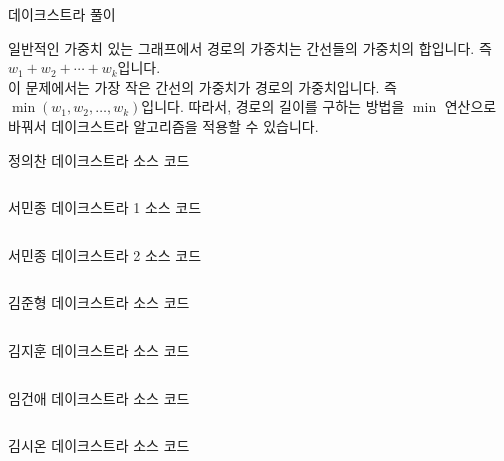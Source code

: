 \begin{frame}{데이크스트라 풀이}

\footnotesize
일반적인 가중치 있는 그래프에서 경로의 가중치는 간선들의 가중치의 합입니다. 즉 $w_1 + w_2 + \cdots + w_k$입니다. \\

이 문제에서는 가장 작은 간선의 가중치가 경로의 가중치입니다. 즉 $\min(w_1, w_2, \ldots, w_k)$입니다.
따라서, 경로의 길이를 구하는 방법을 $\min$ 연산으로 바꿔서 데이크스트라 알고리즘을 적용할 수 있습니다.

\end{frame}

\begin{frame}{정의찬 데이크스트라 소스 코드}
\inputminted{java}{../src/\prob/uichan/Dijkstra.java}
\end{frame}

\begin{frame}{서민종 데이크스트라 1 소스 코드}
\inputminted{java}{../src/\prob/minjong/Main.java}
\end{frame}

\begin{frame}{서민종 데이크스트라 2 소스 코드}
\inputminted{java}{../src/\prob/minjong/Main2.java}
\end{frame}

\begin{frame}{김준형 데이크스트라 소스 코드}
\inputminted{java}{../src/\prob/junhyeong/Main.java}
\end{frame}

\begin{frame}{김지훈 데이크스트라 소스 코드}
\inputminted{java}{../src/\prob/jihoon/BOJ_1939.java}
\end{frame}

\begin{frame}{임건애 데이크스트라 소스 코드}
\inputminted{java}{../src/\prob/keonae/Main.java}
\end{frame}

\begin{frame}{김시온 데이크스트라 소스 코드}
\inputminted{java}{../src/\prob/sion/Dijkstra.java}
\end{frame}

